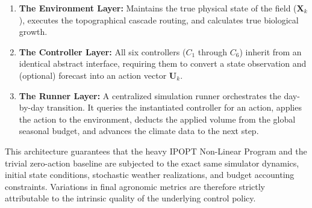 \documentclass[11pt, a4paper]{article}
\begin{document}
\begin{enumerate}
    \item \textbf{The Environment Layer:} Maintains the true physical state of the field ($\mathbf{X}_k$), executes the topographical cascade routing, and calculates true biological growth.
    \item \textbf{The Controller Layer:} All six controllers ($C_1$ through $C_6$) inherit from an identical abstract interface, requiring them to convert a state observation and (optional) forecast into an action vector $\mathbf{U}_k$.
    \item \textbf{The Runner Layer:} A centralized simulation runner orchestrates the day-by-day transition. It queries the instantiated controller for an action, applies the action to the environment, deducts the applied volume from the global seasonal budget, and advances the climate data to the next step. 
\end{enumerate}

This architecture guarantees that the heavy IPOPT Non-Linear Program and the trivial zero-action baseline are subjected to the exact same simulator dynamics, initial state conditions, stochastic weather realizations, and budget accounting constraints. Variations in final agronomic metrics are therefore strictly attributable to the intrinsic quality of the underlying control policy.
\end{document}
